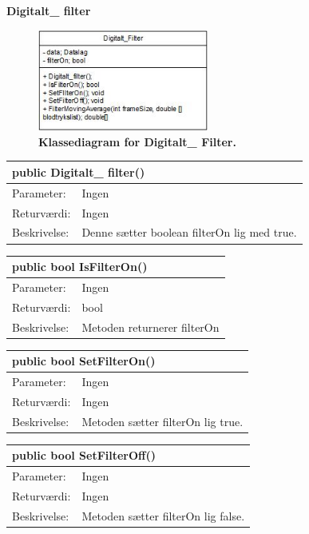 \textbf{Digitalt\_ filter}
\begin{figure}[H]
\includegraphics[width =0.5\textwidth , center]{billeder/klassediagramdigi}
\caption{\textbf{Klassediagram for Digitalt\_ Filter.}}
\end{figure}
\begin{table}[H]
\label{tab:tabel2}
\begin{tabular}{| l | p{13cm} |}
   \hline
   \multicolumn{2}{|l|}{public Digitalt\_ filter()} \\ \hline
   Parameter: & Ingen\\ \hline
   Returværdi: & Ingen \\ \hline
   Beskrivelse: & Denne sætter boolean filterOn lig med true. \\ \hline
\end{tabular}
\end{table}
\begin{table}[H]
\label{tab:tabel2}
\begin{tabular}{| l | p{13cm} |}
   \hline
   \multicolumn{2}{|l|}{public bool IsFilterOn()} \\ \hline
   Parameter: & Ingen\\ \hline
   Returværdi: & bool\\ \hline
   Beskrivelse: & Metoden returnerer filterOn\\ \hline
\end{tabular}
\end{table}
\begin{table}[H]
\label{tab:tabel2}
\begin{tabular}{| l | p{13cm} |}
   \hline
   \multicolumn{2}{|l|}{public bool SetFilterOn()} \\ \hline
   Parameter: & Ingen\\ \hline
   Returværdi: & Ingen\\ \hline
   Beskrivelse: & Metoden sætter filterOn lig true.\\ \hline
\end{tabular}
\end{table}
\begin{table}[H]
\label{tab:tabel2}
\begin{tabular}{| l | p{13cm} |}
   \hline
   \multicolumn{2}{|l|}{public bool SetFilterOff()} \\ \hline
   Parameter: & Ingen\\ \hline
   Returværdi: & Ingen\\ \hline
   Beskrivelse: & Metoden sætter filterOn lig false.\\ \hline
\end{tabular}
\end{table}

